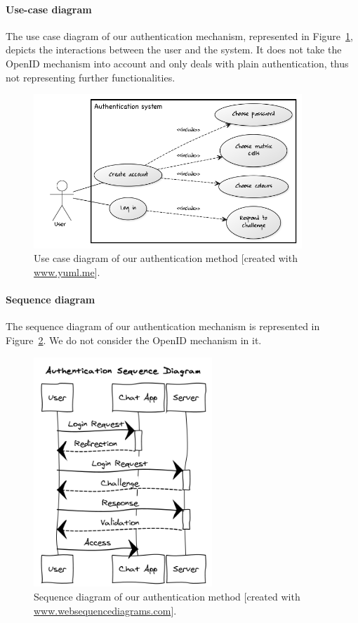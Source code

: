 \documentclass[11pt,a4paper]{article}
\providecommand{\e}[1]{\ensuremath{\times 10^{#1}}}
\begin{document}

\paragraph{Use-case diagram} The use case diagram of our authentication mechanism, represented in Figure~\ref{fig:usecasedia}, depicts the interactions between the user and the system. It does not take the OpenID mechanism into account and only deals with plain authentication, thus not representing further functionalities.
\begin{figure}
\centering
\includegraphics[width=0.9\textwidth]{usecasedia.png}
\caption{Use case diagram of our authentication method [created with \url{www.yuml.me}].}
\label{fig:usecasedia}
\end{figure}


\paragraph{Sequence diagram} The sequence diagram of our authentication mechanism is represented in Figure~\ref{fig:seqdia}. We do not consider the OpenID mechanism in it.
\begin{figure}
\centering
\includegraphics[width=0.6\textwidth]{seqdia.png}
\caption{Sequence diagram of our authentication method [created with \url{www.websequencediagrams.com}].}
\label{fig:seqdia}
\end{figure}
\end{document}
